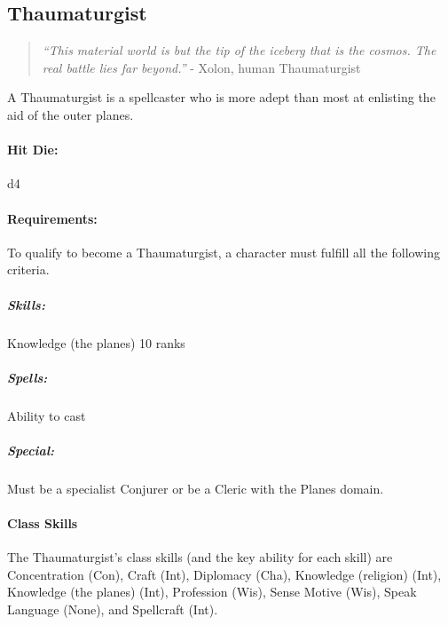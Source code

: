 \subsection{Thaumaturgist}
\begin{quote}
\emph{``This material world is but the tip of the iceberg that is the cosmos. The real battle lies far beyond.''}
- Xolon, human Thaumaturgist
\end{quote}
A Thaumaturgist is a spellcaster who is more adept than most at enlisting the aid of the outer planes.

\begin{table*}
\centering
\caption{The Thaumaturgist}
\label{tab:Thaumaturgist}
\end{table*}

\paragraph{Hit Die:} d4
\paragraph{Requirements:}
To qualify to become a Thaumaturgist, a character must fulfill all the following criteria.
\subparagraph{Skills:} Knowledge (the planes) 10 ranks 
\subparagraph{Spells:} Ability to cast 
\subparagraph{Special:} Must be a specialist Conjurer or be a Cleric with the Planes domain.
\paragraph{Class Skills}
The Thaumaturgist's class skills (and the key ability for each skill) are Concentration (Con), Craft (Int), Diplomacy (Cha), Knowledge (religion) (Int), Knowledge (the planes) (Int), Profession (Wis), Sense Motive (Wis), Speak Language (None), and Spellcraft (Int).
